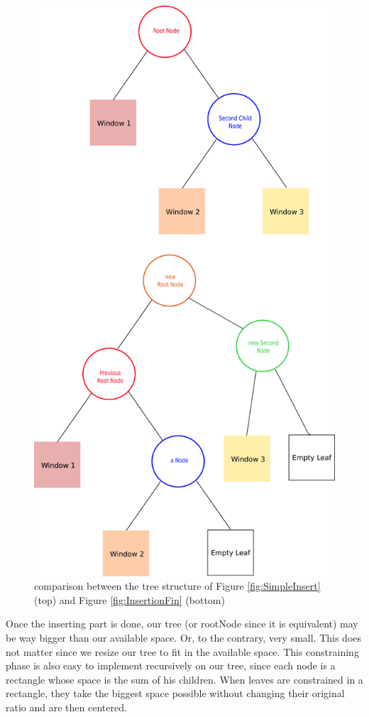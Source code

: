 \documentclass{acmtog}
\begin{document}
\begin{figure}
  \includegraphics[width=\linewidth]{Images/Treestructure.png}
  \caption{comparison between the tree structure of Figure \ref{fig:SimpleInsert} (top) and Figure \ref{fig:InsertionFin} (bottom)}
  \label{fig:TreeStructure}
\end{figure}

Once the inserting part is done, our tree (or rootNode since it is equivalent) may be way bigger than our available space. Or, to the contrary, very small. This does not matter since we resize our tree to fit in the available space. This constraining phase is also easy to implement recursively on our tree, since each node is a rectangle whose space is the sum of his children. When leaves are constrained in a rectangle, they take the biggest space possible without changing their original ratio and are then centered. 
\end{document}
